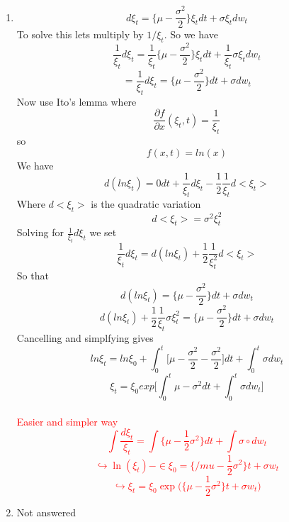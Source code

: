 \documentclass[10pt,a4paper,oneside]{article}
\begin{document}
\begin{enumerate}
        \item $$ d \xi_t = \Big\{\mu - \frac{\sigma^2}{2}\Big\}\xi_t dt + \sigma \xi_t dw_t $$
        To solve this lets multiply by $1/\xi_t$. So we have 
        $$ \frac{1}{\xi_t} d \xi_t = \frac{1}{\xi_t}\Big\{\mu - \frac{\sigma^2}{2} \Big\} \xi_t dt + \frac{1}{\xi_t} \sigma \xi_t dw_t $$
        $$ = \frac{1}{\xi_t} d \xi_t = \Big\{\mu - \frac{\sigma^2}{2}\Big\}dt + \sigma dw_t $$
        Now use Ito's lemma where 
        $$ \frac{\partial f}{\partial x}(\xi_t, t) = \frac{1}{\xi_t} $$
        so
        $$ f(x,t) = ln(x) $$
        We have 
        $$ d(ln \xi_t ) = 0 dt + \frac{1}{\xi_t} d \xi_t -\frac{1}{2} \frac{1}{\xi_t} d<\xi_t > $$
        Where $d <\xi_t > $ is the quadratic variation 
        $$ d < \xi_t > = \sigma^2 \xi_t^2 $$
        Solving for $\frac{1}{\xi_t} d \xi_t$ we set 
        $$ \frac{1}{\xi_t} d \xi_t = d(ln \xi_t ) + \frac{1}{2} \frac{1}{\xi_t^2} d <\xi_t > $$
        So that 
        $$ d(ln \xi_t ) = \Big\{ \mu - \frac{\sigma^2}{2}\Big\}dt + \sigma dw_t $$
        $$ d(ln \xi_t) + \frac{1}{2} \frac{1}{\xi_t} \sigma \xi_t^2 = \Big\{\mu -\frac{\sigma^2}{2} \Big\}dt + \sigma dw_t $$
        Cancelling and simplfying gives
        $$ ln \xi_t = ln \xi_0 + \int_0^t \Big[ {\mu - \frac{\sigma^2}{2}}-\frac{\sigma^2}{2}\Big]dt + \int_0^t \sigma dw_t $$
        $$ \xi_t = \xi_0 exp \Big[ \int_0^t {\mu -\sigma^2} dt + \int_0^t \sigma dw_t \Big] $$
        \\

        \textcolor{red}{ 
            Easier and simpler way 
            $$ \int \frac{d \xi_t}{\xi_t} = \int \Big\{ \mu - \frac{1}{2} \sigma^2 \Big\} dt + \int \sigma \circ dw_t $$
            $$ \hookrightarrow  \ln(\xi_t) - \in{\xi_0} = \Big\{ /mu - \frac{1}{2} \sigma^2 \Big\}t + \sigma w_t$$
            $$ \hookrightarrow \xi_t = \xi_0 \exp \Big( \Big\{\mu - \frac{1}{2}\sigma^2\Big\}t + \sigma w_t \Big) $$
        }
            

        

        \item Not answered
        
    \end{enumerate}
\end{document}
